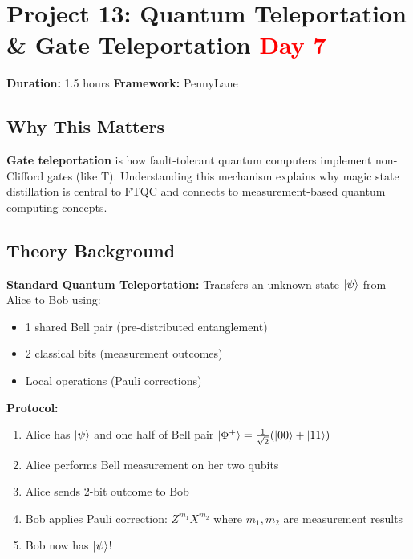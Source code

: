 \documentclass[11pt,a4paper]{article}
\begin{document}
\section{Project 13: Quantum Teleportation \& Gate Teleportation \hfill \textcolor{red}{\textbf{Day 7}}}

\begin{questionbox}
\textbf{Duration:} 1.5 hours \quad \textbf{Framework:} PennyLane
\end{questionbox}

\subsection*{Why This Matters}
\textbf{Gate teleportation} is how fault-tolerant quantum computers implement non-Clifford gates (like T). Understanding this mechanism explains why magic state distillation is central to FTQC and connects to measurement-based quantum computing concepts.

\subsection*{Theory Background}
\textbf{Standard Quantum Teleportation:}
Transfers an unknown state $\ket{\psi}$ from Alice to Bob using:
\begin{itemize}
    \item 1 shared Bell pair (pre-distributed entanglement)
    \item 2 classical bits (measurement outcomes)
    \item Local operations (Pauli corrections)
\end{itemize}

\textbf{Protocol:}
\begin{enumerate}
    \item Alice has $\ket{\psi}$ and one half of Bell pair $\ket{\Phi^+} = \frac{1}{\sqrt{2}}(\ket{00} + \ket{11})$
    \item Alice performs Bell measurement on her two qubits
    \item Alice sends 2-bit outcome to Bob
    \item Bob applies Pauli correction: $Z^{m_1} X^{m_2}$ where $m_1, m_2$ are measurement results
    \item Bob now has $\ket{\psi}$!
\end{enumerate}
\end{document}
